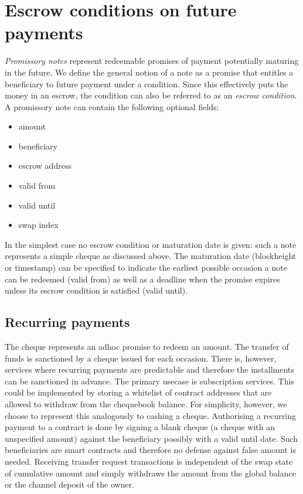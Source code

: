 \documentclass[a4paper,10pt]{article}
\newcommand\gloss[1]{\emph{\gls{#1}}}
\begin{document}
\section{Escrow conditions on future payments}

\gloss{Promissory notes} represent redeemable promises of payment potentially maturing in the future.
We define the general notion of a note as a promise that entitles a beneficiary to future payment
under a condition. Since this effectively puts the money in an escrow, the condition can
also be referred to as an \gloss{escrow condition}.
A promissory note can contain the following optional fields:

  \begin{itemize}
    \item amount
    \item beneficiary
    \item escrow address
    \item valid from
    \item valid until
    \item swap index
  \end{itemize}

In the simplest case no escrow condition or maturation date is given: such a note
represents a simple cheque as discussed above.
The maturation date (blockheight or timestamp) can be specified to indicate the earliest
possible occasion a note can be redeemed (valid from) as well as a deadline when the promise
expires unless its escrow condition is satisfied (valid until).

\subsection{Recurring payments}

The cheque represents an adhoc promise to redeem an amount.
The transfer of funds is sanctioned by a cheque issued for each occasion.
There is, however, services where recurring payments are predictable and therefore
the installments can be sanctioned in advance. The primary usecase is subscription
services.
This could be implemented by storing a whitelist of contract addresses that are allowed
to withdraw from the chequebook balance.
For simplicity, however, we choose to represent this analogously to cashing a cheque.
Authorising a recurring payment to a contract is done by signing a blank cheque (a cheque with
an unspecified amount) against the beneficiary possibly with a valid until date.
Such beneficiaries are smart contracts and therefore no defense against
false amount is needed.
Receiving transfer request transactions is independent of the swap state of cumulative amount
and simply withdraws the amount from the global balance or the channel deposit of the owner.
\end{document}
